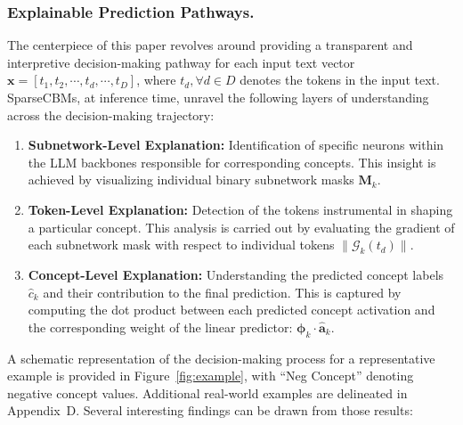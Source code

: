\documentclass[letterpaper]{article} %
\begin{document}
\subsubsection{Explainable Prediction Pathways.}
The centerpiece of this paper revolves around providing a transparent and interpretive decision-making pathway for each input text vector $\bm{x} = [t_1,t_2,\cdots, t_d,\cdots,t_D]$, where $t_d, \forall d \in D$ denotes the tokens in the input text. SparseCBMs, at inference time, unravel the following layers of understanding across the decision-making trajectory:



\begin{enumerate}
\item \textbf{Subnetwork-Level Explanation:} Identification of specific neurons within the LLM backbones responsible for corresponding concepts. This insight is achieved by visualizing individual binary subnetwork masks
$\bm{M}_k$.
\item \textbf{Token-Level Explanation:} Detection of the tokens instrumental in shaping a particular concept. This analysis is carried out by evaluating the gradient of each subnetwork mask with respect to individual tokens $\|\mathcal{G}_k(t_d)\|$.
\item \textbf{Concept-Level Explanation:} Understanding the predicted concept labels $\hat{c}_k$ and their contribution to the final prediction. This is captured by computing the dot product between each predicted concept activation and the corresponding weight of the linear predictor: $\bm{\phi}_k\cdot\hat{\bm{a}}_k$.
\end{enumerate}
A schematic representation of the decision-making process for a representative example is provided in Figure~\ref{fig:example}, with ``Neg Concept'' denoting negative concept values. Additional real-world examples are delineated in Appendix~D. Several interesting findings can be drawn from those results:
\end{document}
